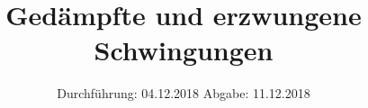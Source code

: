 

\subject{V354}
\title{Gedämpfte und erzwungene Schwingungen}
\date{%
  Durchführung: 04.12.2018
  \hspace{3em}
  Abgabe: 11.12.2018
}



\maketitle
\thispagestyle{empty}
\tableofcontents
\newpage







\printbibliography{}


